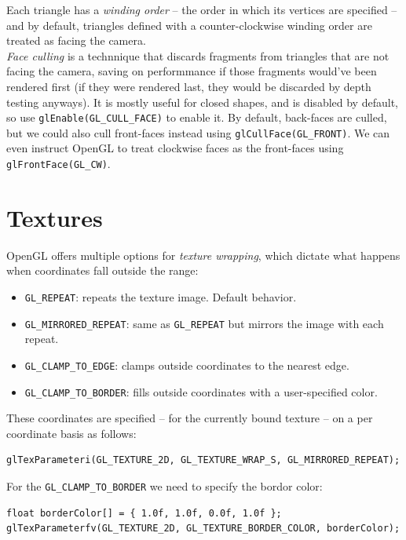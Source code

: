 \documentclass[table, xcdraw]{article}%
\begin{document}
Each triangle has a \emph{winding order} -- the order in which its vertices are specified -- and by default, triangles defined with a counter-clockwise winding order are treated as facing the camera.\\
\emph{Face culling} is a technnique that discards fragments from triangles that are not facing the camera, saving on performmance if those fragments would've been rendered first (if they were rendered last, they would be discarded by depth testing anyways). It is mostly useful for closed shapes, and is disabled by default, so use \texttt{glEnable(GL_CULL_FACE)} to enable it. By default, back-faces are culled, but we could also cull front-faces instead using \texttt{glCullFace(GL_FRONT)}. We can even instruct OpenGL to treat clockwise faces as the front-faces using \texttt{glFrontFace(GL_CW)}.

\section{Textures}

OpenGL offers multiple options for \emph{texture wrapping}, which dictate what happens when coordinates fall outside the range:

\begin{itemize}
    \item \texttt{GL_REPEAT}: repeats the texture image. Default behavior.
    \item \texttt{GL_MIRRORED_REPEAT}: same as \texttt{GL_REPEAT} but mirrors the image with each repeat.
    \item \texttt{GL_CLAMP_TO_EDGE}: clamps outside coordinates to the nearest edge.
    \item \texttt{GL_CLAMP_TO_BORDER}: fills outside coordinates with a user-specified color.
\end{itemize}

These coordinates are specified -- for the currently bound texture -- on a per coordinate basis as follows:

\begin{verbatim}
glTexParameteri(GL_TEXTURE_2D, GL_TEXTURE_WRAP_S, GL_MIRRORED_REPEAT);
\end{verbatim}

For the \texttt{GL_CLAMP_TO_BORDER} we need to specify the bordor color:

\begin{verbatim}
float borderColor[] = { 1.0f, 1.0f, 0.0f, 1.0f };
glTexParameterfv(GL_TEXTURE_2D, GL_TEXTURE_BORDER_COLOR, borderColor);
\end{verbatim}
\end{document}
